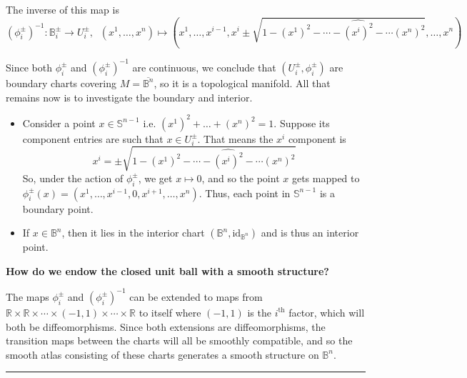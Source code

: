 \documentclass{article}
\newcommand{\R}{\mathbb{R}}
\begin{document}
\vskip 0.5cm
The inverse of this map is 
\[ (\phi_i^{\pm})^{-1} : \mathbb{B}_i^{\pm} \rightarrow U_i^{\pm}, \;\; (x^1, \dots, x^n) \mapsto  \left( x^1, \dots, x^{i-1}, x^i \pm \sqrt{1 - (x^1)^2 - \cdots - \widehat{(x^i)^2} - \cdots (x^n)^2}, \dots, x^n \right) \]

Since both $\phi_i^{\pm}$ and $(\phi_i^{\pm})^{-1}$ are continuous, we conclude that $(U_i^{\pm}, \phi_i^{\pm})$ are boundary charts covering $M = \overline{\mathbb{B}^n}$, so it is a topological manifold. All that remains now is to investigate the boundary and interior.
\vskip 0.5cm
\begin{itemize}
  \item Consider a point $x \in \mathbb{S}^{n-1}$ i.e. $(x^1)^2 + \dots + (x^n)^2 = 1$. Suppose its component entries are such that $x \in U_i^{\pm}$. That means the $x^i$ component is
  \[ x^i = \pm \sqrt{1 - (x^1)^2 - \cdots - \widehat{(x^{i})^2} - \cdots (x^n)^2} \]
  So, under the action of $\phi_i^{\pm}$, we get $x \mapsto 0$, and so the point $x$ gets mapped to $\phi_i^{\pm}(x) = \left( x^1, \dots, x^{i-1}, 0, x^{i+1}, \dots, x^n \right)$. Thus, each point in $\mathbb{S}^{n-1}$ is a boundary point.

  \item If $x \in \mathbb{B}^n$, then it lies in the interior chart $(\mathbb{B}^n, \mathrm{id}_{\mathbb{B}^n})$ and is thus an interior point.
\end{itemize}

\vskip 0.5cm
\textbf{How do we endow the closed unit ball with a smooth structure?}

\vskip 0.25cm
The maps $\phi_i^{\pm}$ and $(\phi_i^{\pm})^{-1}$ can be extended to maps from $\R \times \R \times \cdots \times (-1, 1) \times \cdots \times \R$ to itself where $(-1, 1)$ is the $i^{\text{th}}$ factor, which will both be diffeomorphisms. Since both extensions are diffeomorphisms, the transition maps between the charts will all be smoothly compatible, and so the smooth atlas consisting of these charts generates a smooth structure on $\mathbb{B}^n$.



\vskip 0.5cm
\hrule 
\vskip 0.5cm

\end{document}
